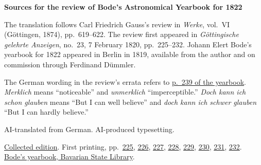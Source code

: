 \clearpage\thispagestyle{empty}
\begin{center}\Large\bfseries Sources for the review of Bode’s Astronomical Yearbook for 1822\end{center}

The translation follows Carl Friedrich Gauss’s review in \emph{Werke}, vol.~VI (Göttingen, 1874), pp.~619--622. The review first appeared in \emph{Göttingische gelehrte Anzeigen}, no.~23, 7 February 1820, pp.~225--232. Johann Elert Bode’s yearbook for 1822 appeared in Berlin in 1819, available from the author and on commission through Ferdinand Dümmler.

The German wording in the review’s errata refers to \href{https://api.digitale-sammlungen.de/iiif/image/v2/bsb10538351_00245/full/1650,/0/default.jpg}{p.~239 of the yearbook}. \emph{Merklich} means “noticeable” and \emph{unmerklich} “imperceptible.” \emph{Doch kann ich schon glauben} means “But I can well believe” and \emph{doch kann ich schwer glauben} “But I can hardly believe.”

AI-translated from German. AI-produced typesetting.

\href{https://gdz.sub.uni-goettingen.de/id/PPN236007467}{Collected edition}. First printing, pp.~\href{https://images.p.sub.uni-goettingen.de/iiif/image/gdz:PPN319721507_1820:00000219/full/1650,/0/default.jpg}{225}, \href{https://images.p.sub.uni-goettingen.de/iiif/image/gdz:PPN319721507_1820:00000220/full/1650,/0/default.jpg}{226}, \href{https://images.p.sub.uni-goettingen.de/iiif/image/gdz:PPN319721507_1820:00000221/full/1650,/0/default.jpg}{227}, \href{https://images.p.sub.uni-goettingen.de/iiif/image/gdz:PPN319721507_1820:00000222/full/1650,/0/default.jpg}{228}, \href{https://images.p.sub.uni-goettingen.de/iiif/image/gdz:PPN319721507_1820:00000223/full/1650,/0/default.jpg}{229}, \href{https://images.p.sub.uni-goettingen.de/iiif/image/gdz:PPN319721507_1820:00000224/full/1650,/0/default.jpg}{230}, \href{https://images.p.sub.uni-goettingen.de/iiif/image/gdz:PPN319721507_1820:00000225/full/1650,/0/default.jpg}{231}, \href{https://images.p.sub.uni-goettingen.de/iiif/image/gdz:PPN319721507_1820:00000226/full/1650,/0/default.jpg}{232}. \href{https://api.digitale-sammlungen.de/iiif/image/v2/bsb10538351_00003/full/1650,/0/default.jpg}{Bode’s yearbook, Bavarian State Library}.

\clearpage
